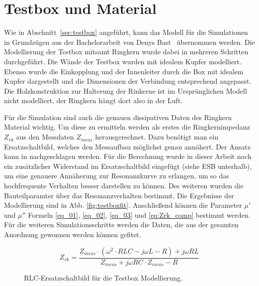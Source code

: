 \section{Testbox und Material}
Wie in Abschnitt~\ref{sec:testbox} angef\"uhrt, kann das Modell f\"ur die Simulationen in Grundz\"ugen aus der Bachelorarbeit von Denys Bast~\cite{bast2017ba} \"ubernommen werden. Die Modellierung der Testbox mitsamt Ringkern wurde dabei in mehreren Schritten durchgef\"uhrt. Die W\"ande der Testbox wurden mit idealem Kupfer modelliert. Ebenso wurde die Einkopplung und der Innenleiter durch die Box mit idealem Kupfer dargestellt und die Dimensionen der Verbindung entsprechend angepasst. Die Holzkonstruktion zur Halterung der Rinkerne ist im Urspr\"unglichen Modell nicht modelliert, der Ringkern h\"angt dort also in der Luft.
\par

F\"ur die Simulation sind auch die genauen dissipativen Daten des Ringkern Material wichtig. Um diese zu ermitteln werden als erstes die Ringkernimpedanz $Z_{rk}$ aus den Messdaten $Z_{meas}$ herausgerechnet. Dazu benötigt man ein Ersatzschaltbild, welches den Messaufbau möglichst genau annähert. Der Ansatz kann in \cite{bast2017ba} nachgeschlagen werden. F\"ur die Berechnung wurde in dieser Arbeit noch ein zus\"atzlicher Widerstand im Ersatzschaltbild eingef\"ugt (siehe ESB unterhalb), um eine genauere Ann\"aherung zur Resonanzkurve zu erlangen, um so das hochfrequente Verhalten besser darstellen zu k\"onnen. Des weiteren wurden die Bauteilparamter \"uber das Resonanzverhalten bestimmt. Die Ergebnisse der Modellierung sind in Abb. \ref{fig:testboxfit}.
Anschlie\ss{}end k\"onnen die Parameter $\mu'$ und $\mu''$ Formeln \ref{eq_01}, \ref{eq_02}, \ref{eq_03} und \ref{eq:Zrk_comp} bestimmt werden. F\"ur die weiteren Simulationsschritte werden die Daten, die aus der gesamten Anordnung gewonnen werden k\"onnen gefitet.        


\begin{equation}\label{eq:Zrk_comp}
Z_{rk} = \frac{Z_{meas}\cdot(\omega^2\cdot RLC - j\omega L - R) + j\omega RL}{Z_{meas} + j\omega RC\cdot Z_{meas} -R}
\end{equation}

\par
\begin{figure}[htb]
\centering
{}
\caption{RLC-Ersatzschaltbild f\"ur die Testbox Modellierung.}
\end{figure}


